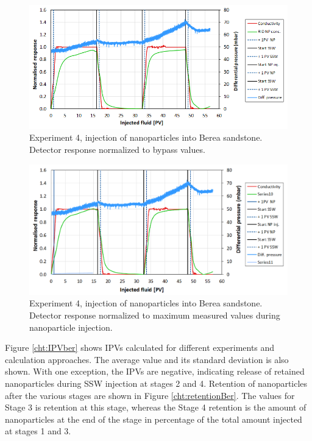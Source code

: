 \begin{figure}[h]
    \centering
    \includegraphics[width=\textwidth]{img/cht/injexp4ber1.png}
    \caption{Experiment 4, injection of nanoparticles into Berea sandstone. Detector response normalized to bypass values.}
    \label{cht:injexp4ber1}
\end{figure}

\begin{figure}[h]
    \centering
    \includegraphics[width=\textwidth]{img/cht/injexp4ber2.png}
    \caption{Experiment 4, injection of nanoparticles into Berea sandstone. Detector response normalized to maximum measured values during nanoparticle injection.}
    \label{cht:injexp4ber2}
\end{figure}

Figure \ref{cht:IPVber} shows IPVs calculated for different experiments and calculation approaches. The average value and its standard deviation is also shown. With one exception, the IPVs are negative, indicating release of retained nanoparticles during SSW injection at stages 2 and 4. Retention of nanoparticles after the various stages are shown in Figure \ref{cht:retentionBer}. The values for Stage 3 is retention at this stage, whereas the Stage 4 retention is the amount of nanoparticles at the end of the stage in percentage of the total amount injected at stages 1 and 3.

